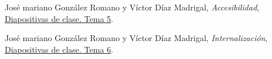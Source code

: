 \documentclass[a4paper,11pt]{article}
\begin{document}
\begin{thebibliography}{99}
José mariano González Romano y Víctor Díaz Madrigal,
\textit{Accesibilidad},
\href{https://s3-eu-central-1.amazonaws.com/learn-eu-central-1-prod-fleet01-xythos/5ac734ed505df/2113026?response-content-disposition=inline%3B%20filename%2A%3DUTF-8%27%27IPO-2018-19-05-Accesibilidad.pdf&response-content-type=application%2Fpdf&X-Amz-Algorithm=AWS4-HMAC-SHA256&X-Amz-Date=20181204T121814Z&X-Amz-SignedHeaders=host&X-Amz-Expires=21600&X-Amz-Credential=AKIAIZ3QX2YUHH4EOO3A%2F20181204%2Feu-central-1%2Fs3%2Faws4_request&X-Amz-Signature=c47e51bae64476cffa8186f4f4bb7c40257eac45d1f2a68b63e6b66dbc5a1609}{Diapositivas de clase. Tema 5}.

José mariano González Romano y Víctor Díaz Madrigal,
\textit{Internalización},
\href{https://s3-eu-central-1.amazonaws.com/learn-eu-central-1-prod-fleet01-xythos/5ac734ed505df/2214811?response-content-disposition=inline%3B%20filename%2A%3DUTF-8%27%27IPO-2018-19-06-Internacionalizaci%25C3%25B3n.pdf&response-content-type=application%2Fpdf&X-Amz-Algorithm=AWS4-HMAC-SHA256&X-Amz-Date=20181204T121848Z&X-Amz-SignedHeaders=host&X-Amz-Expires=21600&X-Amz-Credential=AKIAIZ3QX2YUHH4EOO3A%2F20181204%2Feu-central-1%2Fs3%2Faws4_request&X-Amz-Signature=e7b08ac13f1e9819a1a8f39938e1176631bfe0cf869f6b30b0e687b6a0efa442}{Diapositivas de clase. Tema 6}.





\end{thebibliography}
\end{document}
